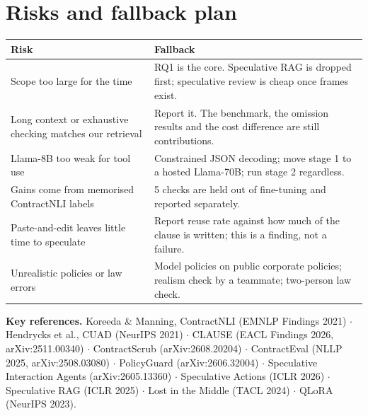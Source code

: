 \documentclass[11pt,a4paper]{article}
\begin{document}
\section{Risks and fallback plan}
\begin{table}[H]\small
\begin{tabularx}{\textwidth}{@{}LL@{}}
\toprule
\textbf{Risk} & \textbf{Fallback} \\
\midrule
Scope too large for the time & RQ1 is the core. Speculative RAG is dropped first; speculative review is cheap once frames exist. \\
Long context or exhaustive checking matches our retrieval & Report it. The benchmark, the omission results and the cost difference are still contributions. \\
Llama-8B too weak for tool use & Constrained JSON decoding; move stage 1 to a hosted Llama-70B; run stage 2 regardless. \\
Gains come from memorised ContractNLI labels & 5 checks are held out of fine-tuning and reported separately. \\
Paste-and-edit leaves little time to speculate & Report reuse rate against how much of the clause is written; this is a finding, not a failure. \\
Unrealistic policies or law errors & Model policies on public corporate policies; realism check by a teammate; two-person law check. \\
\bottomrule
\end{tabularx}
\end{table}

\vspace{-4pt}
{\footnotesize\textbf{Key references.} Koreeda \& Manning, ContractNLI (EMNLP Findings 2021) $\cdot$ Hendrycks et al., CUAD (NeurIPS 2021) $\cdot$ CLAUSE (EACL Findings 2026, arXiv:2511.00340) $\cdot$ ContractScrub (arXiv:2608.20204) $\cdot$ ContractEval (NLLP 2025, arXiv:2508.03080) $\cdot$ PolicyGuard (arXiv:2606.32004) $\cdot$ Speculative Interaction Agents (arXiv:2605.13360) $\cdot$ Speculative Actions (ICLR 2026) $\cdot$ Speculative RAG (ICLR 2025) $\cdot$ Lost in the Middle (TACL 2024) $\cdot$ QLoRA (NeurIPS 2023).}
\end{document}
